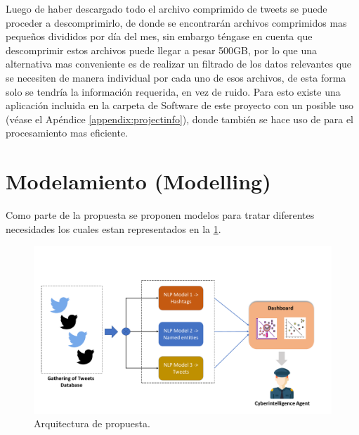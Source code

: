 Luego de haber descargado todo el archivo comprimido de tweets se puede proceder a descomprimirlo, de donde se encontrarán archivos comprimidos mas pequeños divididos por día del mes, sin embargo téngase en cuenta que descomprimir estos archivos puede llegar a pesar 500GB, por lo que una alternativa mas conveniente es de realizar un filtrado de los datos relevantes que se necesiten de manera individual por cada uno de esos archivos, de esta forma solo se tendría la información requerida, en vez de ruido. Para esto existe una aplicación incluida en la carpeta de Software de este proyecto con un posible uso (véase el Apéndice \ref{appendix:projectinfo}), donde también se hace uso de \cite{Tange2011a} para el procesamiento mas eficiente.


\section{Modelamiento (Modelling)}
Como parte de la propuesta se proponen \nmodels modelos para tratar diferentes necesidades los cuales estan representados en la \cref{fig:proposal-arch}.

\begin{figure}[H]
  \centering
  \includegraphics[width=\textwidth]{Figures/general-architecture.pdf}
\decoRule
\caption[Arquitectura de propuesta]{Arquitectura de propuesta.}
\label{fig:proposal-arch}
\end{figure}


